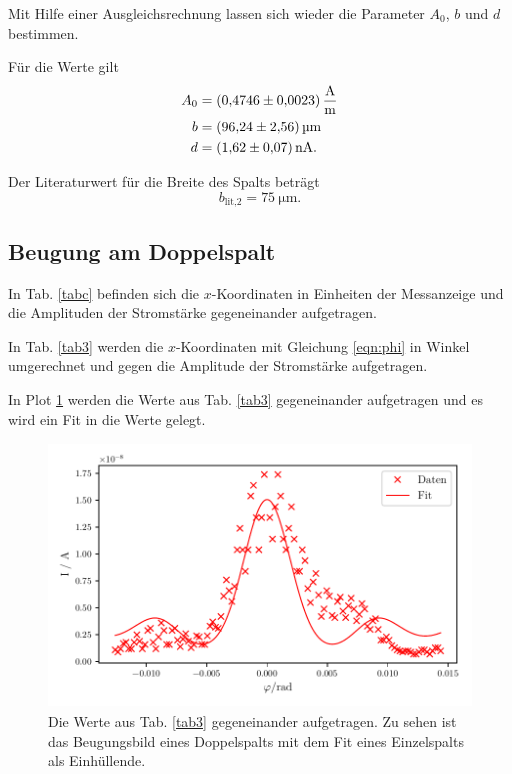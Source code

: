 \noindent Mit Hilfe einer Ausgleichsrechnung lassen sich wieder die Parameter $A_0$, $b$ und $d$ bestimmen. 

\noindent Für die Werte gilt
\begin{align*}
    A_0 &= \SI{0.4746 (023)}{\ampere\per\meter} \\
    b &= \SI{96.24 \pm 2.56}{\micro\meter} \\
    d &= \SI{1.62(07)}{\nano\ampere}. 
\end{align*}

\noindent Der Literaturwert für die Breite des Spalts beträgt
\begin{equation*}
    b_\text{lit,2} = \SI{75}{\micro\meter}.
\end{equation*}


\subsection{Beugung am Doppelspalt}
In Tab. \ref{tabc} befinden sich  die $x$-Koordinaten in Einheiten der Messanzeige und die Amplituden der Stromstärke gegeneinander aufgetragen. 



\noindent In Tab. \ref{tab3} werden die $x$-Koordinaten mit Gleichung \eqref{eqn:phi} in Winkel umgerechnet und gegen die Amplitude der Stromstärke aufgetragen. 



\noindent In Plot \ref{fig:plot3} werden die Werte aus Tab. \ref{tab3} gegeneinander aufgetragen und es wird ein Fit in die Werte gelegt. 

\begin{figure}
    \centering
    \includegraphics[width=12cm, height=7cm]{build/plot3.pdf}
    \caption{Die Werte aus Tab. \ref{tab3} gegeneinander aufgetragen.
    Zu sehen ist das Beugungsbild eines Doppelspalts mit dem Fit eines
    Einzelspalts als Einhüllende.}
    \label{fig:plot3}
\end{figure}

